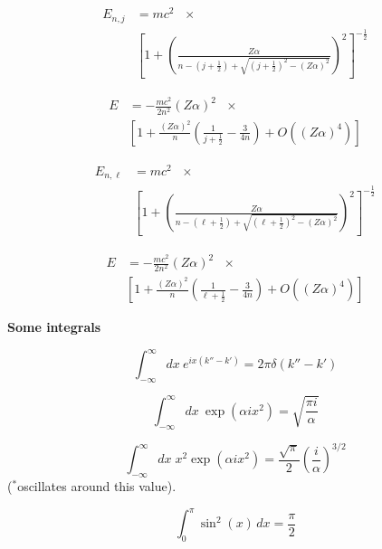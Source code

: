 \documentclass[11pt]{article}
\begin{document}
\begin{multicols}{2}
\begin{align}
  E_{n,j} & = mc^2 \:\:\: \times \nonumber \\
    & \left[1 +
    \left(
    \frac{Z\alpha}{
      n - (j+\frac{1}{2}) + \sqrt{(j+\frac{1}{2})^2 - (Z\alpha)^2}
      }
    \right)^2
    \right]^{-\frac{1}{2}}
\end{align}

\begin{align}
  E & = - \frac{mc^2}{2n^2} (Z\alpha)^2 \:\:\: \times \nonumber \\
  & \left[ 1 + \frac{(Z\alpha)^2}{n}
  \left( \frac{1}{j+\frac{1}{2}} - \frac{3}{4n}
  \right)
  +O((Z\alpha)^4) \right]
\end{align}


\begin{align}
  E_{n,\ell} & = mc^2 \:\:\: \times \nonumber \\
    & \left[1 +
    \left(
    \frac{Z\alpha}{
      n - (\ell+\frac{1}{2}) + \sqrt{(\ell+\frac{1}{2})^2 - (Z\alpha)^2}
      }
    \right)^2
    \right]^{-\frac{1}{2}}
\end{align}

\begin{align}
  E & = - \frac{mc^2}{2n^2} (Z\alpha)^2 \:\:\: \times \nonumber \\
  & \left[ 1 + \frac{(Z\alpha)^2}{n}
  \left( \frac{1}{\ell+\frac{1}{2}} - \frac{3}{4n}
  \right)
  +O((Z\alpha)^4) \right]
\end{align}

{\bf Some integrals}

\begin{equation}
\int_{-\infty}^{\infty} dx \: e^{ix(k''-k')} = 2 \pi \delta (k''-k')
\end{equation}

\begin{equation}
\int_{-\infty}^{\infty} dx \: \exp (\alpha i x^2) = \sqrt{\frac{\pi i}{\alpha}}
\label{eq:simp_int}
\end{equation}

\begin{equation}
\int_{-\infty}^{\infty} dx \; x^2 \exp (\alpha i x^2)
  = \frac{\sqrt{\pi}}{2} \left( \frac{i}{\alpha} \right)^{3/2}
\label{eq:2nd_simp_int}
\end{equation}
{\small ($^{*}$oscillates around this value)}.

\begin{equation}
\int_{0}^{\pi} \sin^{2}{\left (x \right )}\, dx  =  \frac{\pi}{2}
\end{equation}


\end{multicols}
\end{document}
